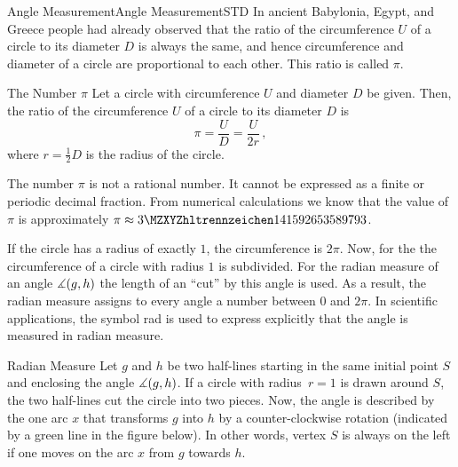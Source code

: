 \begin{MXContent}{Angle Measurement}{Angle Measurement}{STD}
In ancient Babylonia, Egypt, and Greece people had already observed that
the ratio of the circumference $U$ of a circle to its diameter $D$ is always 
the same, and hence circumference and diameter of a circle are proportional to 
each other. This ratio is called $\pi$.


\begin{MXInfo}{The Number $\pi$}%
Let a circle with circumference $U$ and diameter $D$ be given. 
Then, the ratio of the circumference $U$ of a circle to its diameter $D$
is
\[
\pi = \frac{U}{D} = \frac{U}{2r}\, ,%
\]
where $r = \frac{1}{2} D$ is the radius of the circle.

The number $\pi$ is not a rational number. It cannot be expressed as a 
finite or periodic decimal fraction. From numerical calculations we know that
the value of $\pi$ is approximately $\pi \approx \MZahl{3}{141592653589793}$.
\end{MXInfo}

If the circle has a radius of exactly $1$, the circumference is $2\pi$. Now, for the 
 the circumference of a circle with radius $1$ is subdivided. 
For the radian measure of an angle $\measuredangle(g,h)$ the length of an  
``cut'' by this angle is used. As a result, the radian measure assigns to every angle a number 
between $0$ and $2\pi$. In scientific applications, the symbol rad is used to
express explicitly that the angle is measured in radian measure.

\begin{MXInfo}{Radian Measure}%
Let $g$ and $h$ be two half-lines starting in the same initial point $S$ and enclosing 
the angle $\measuredangle(g,h)$. If a circle with radius~$r = 1$ is drawn around $S$, the
two half-lines cut the circle into two pieces. Now, the angle is described by the one arc $x$ 
that transforms $g$ into $h$ by a counter-clockwise rotation (indicated by a green line in the 
figure below). In other words, vertex $S$ is always on the left if one moves on the 
arc $x$ from $g$ towards $h$.

\begin{center}
\end{center}


\end{MXInfo}
\end{MXContent}
